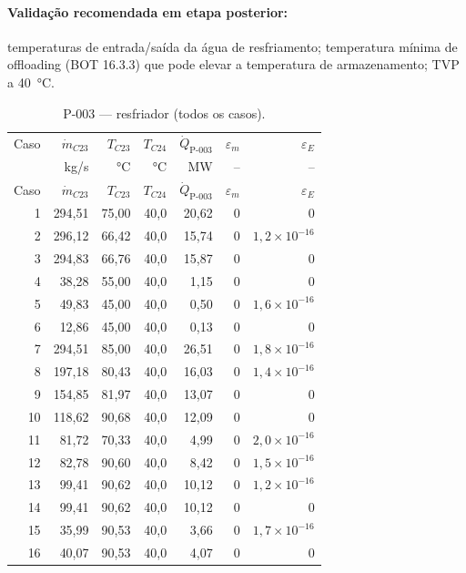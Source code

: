 \documentclass[11pt,a4paper]{article}
\numberwithin{equation}{section}
\numberwithin{table}{section}
\numberwithin{figure}{section}
\begin{document}
\paragraph{Validação recomendada em etapa posterior:} temperaturas de entrada/saída da água de resfriamento; temperatura mínima de offloading (BOT 16.3.3) que pode elevar a temperatura de armazenamento; TVP a 40~\si{\celsius}.
{\footnotesize\setlength{\tabcolsep}{3.5pt}\begin{longtable}{rrrrrrr}
\caption{P-003 --- resfriador (todos os casos).\label{tab:b15}}\\\toprule
Caso & $\dot m_{C23}$ & $T_{C23}$ & $T_{C24}$ & $\dot Q_{\mbox{P-003}}$ & $\varepsilon_m$ & $\varepsilon_E$\\
 & kg/s & °C & °C & MW & -- & --\\\midrule\endfirsthead
\toprule Caso & $\dot m_{C23}$ & $T_{C23}$ & $T_{C24}$ & $\dot Q_{\mbox{P-003}}$ & $\varepsilon_m$ & $\varepsilon_E$\\\midrule\endhead
1 & 294,51 & 75,00 & 40,0 & 20,62 & $0$ & $0$\\
2 & 296,12 & 66,42 & 40,0 & 15,74 & $0$ & $1{,}2\times10^{-16}$\\
3 & 294,83 & 66,76 & 40,0 & 15,87 & $0$ & $0$\\
4 & 38,28 & 55,00 & 40,0 & 1,15 & $0$ & $0$\\
5 & 49,83 & 45,00 & 40,0 & 0,50 & $0$ & $1{,}6\times10^{-16}$\\
6 & 12,86 & 45,00 & 40,0 & 0,13 & $0$ & $0$\\
7 & 294,51 & 85,00 & 40,0 & 26,51 & $0$ & $1{,}8\times10^{-16}$\\
8 & 197,18 & 80,43 & 40,0 & 16,03 & $0$ & $1{,}4\times10^{-16}$\\
9 & 154,85 & 81,97 & 40,0 & 13,07 & $0$ & $0$\\
10 & 118,62 & 90,68 & 40,0 & 12,09 & $0$ & $0$\\
11 & 81,72 & 70,33 & 40,0 & 4,99 & $0$ & $2{,}0\times10^{-16}$\\
12 & 82,78 & 90,60 & 40,0 & 8,42 & $0$ & $1{,}5\times10^{-16}$\\
13 & 99,41 & 90,62 & 40,0 & 10,12 & $0$ & $1{,}2\times10^{-16}$\\
14 & 99,41 & 90,62 & 40,0 & 10,12 & $0$ & $0$\\
15 & 35,99 & 90,53 & 40,0 & 3,66 & $0$ & $1{,}7\times10^{-16}$\\
16 & 40,07 & 90,53 & 40,0 & 4,07 & $0$ & $0$\\
\bottomrule\end{longtable}}
\end{document}
